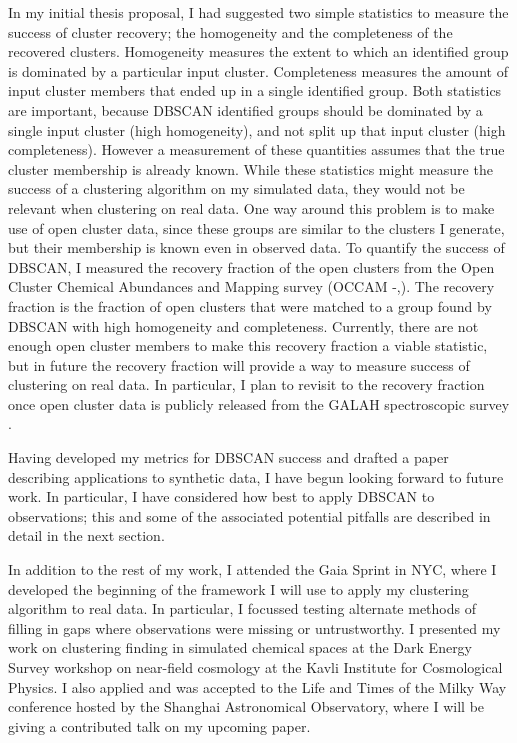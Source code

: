 \documentclass[11pt]{article}
\begin{document}
	In my initial thesis proposal, I had suggested two simple statistics to measure the success of cluster recovery; the homogeneity and the completeness of the recovered clusters. Homogeneity measures the extent to which an identified group is dominated by a particular input cluster. Completeness measures the amount of input cluster members that ended up in a single identified group. Both statistics are important, because DBSCAN identified groups should be dominated by a single input cluster (high homogeneity), and not split up that input cluster (high completeness). However a measurement of these quantities assumes that the true cluster membership is already known. While these statistics might measure the success of a clustering algorithm on my simulated data, they would not be relevant when clustering on real data. One way around this problem is to make use of open cluster data, since these groups are similar to the clusters I generate, but their membership is known even in observed data. To quantify the success of DBSCAN, I measured the recovery fraction of the open clusters from the Open Cluster Chemical Abundances and Mapping survey (OCCAM -\citealt{Frinchaboy2003},\citealt{Donor2018}). The recovery fraction is the fraction of open clusters that were matched to a group found by DBSCAN with high homogeneity and completeness. Currently, there are not enough open cluster members to make this recovery fraction a viable statistic, but in future the recovery fraction will provide a way to measure success of clustering on real data. In particular, I plan to revisit to the recovery fraction once open cluster data is publicly released from the GALAH spectroscopic survey \citep{DeSilva2015}.
	
	Having developed my metrics for DBSCAN success and drafted a paper describing applications to synthetic data, I have begun looking forward to future work. In particular, I have considered how best to apply DBSCAN to observations; this and some of the associated potential pitfalls are described in detail in the next section.
    
    In addition to the rest of my work, I attended the Gaia Sprint in NYC, where I developed the beginning of the framework I will use to apply my clustering algorithm to real data. In particular, I focussed testing alternate methods of filling in gaps where observations were missing or untrustworthy. I presented my work on clustering finding in simulated chemical spaces at the Dark Energy Survey workshop on near-field cosmology at the Kavli Institute for Cosmological Physics. I also applied and was accepted to the Life and Times of the Milky Way conference hosted by the Shanghai Astronomical Observatory, where I will be giving a contributed talk on my upcoming paper.
  
\end{document}
